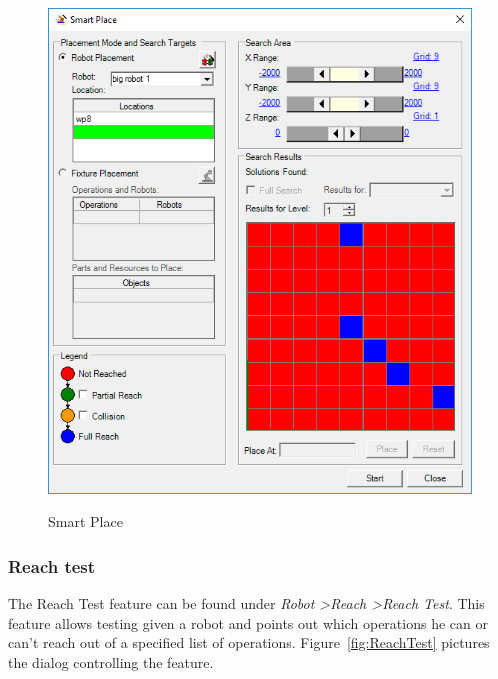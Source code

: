 \begin{figure}[H]
    \caption{Smart Place}
    \centering
    \includegraphics{smart_place}
    \label{fig:SmartPlace}
\end{figure}

\subsubsection{Reach test}
The Reach Test feature can be found under \emph{Robot \textgreater Reach \textgreater Reach Test}.
This feature allows testing given a robot and points out which operations he can or can't reach out of a specified list of operations.
Figure~\ref{fig:ReachTest} pictures the dialog controlling the feature.  \\

